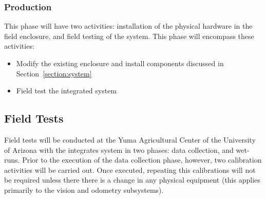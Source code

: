 \documentclass[12pt]{article}
\begin{document}
{\subsubsection{Production}
This phase will have two activities: installation of the physical hardware in the field enclosure, and field testing of the system. This phase will encompass these activities:
\begin{itemize}
	\item{Modify the existing enclosure and install components discussed in Section~\ref{section:system}}
	\item{Field test the integrated system}
\end{itemize}
\subsection{Field Tests}
Field tests will be conducted at the Yuma Agricultural Center of the University of Arizona with the integrates system in two phases: data collection, and wet-runs. Prior to the execution of the data collection phase, however, two calibration activities will be carried out. Once executed, repeating this calibrations will not be required unless there there is a change in any physical equipment (this applies primarily to the vision and odometry subsystems).
}
\end{document}
